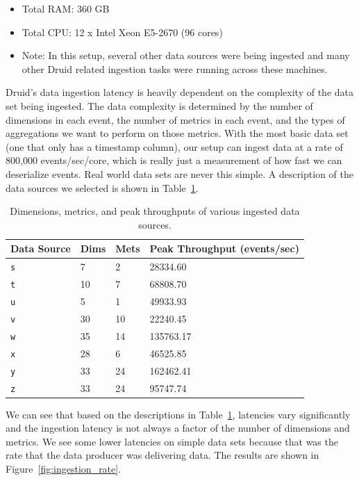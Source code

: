 \documentclass{acm_proc_article-sp}
\begin{document}
\begin{itemize}
\item Total RAM: 360 GB 
\item Total CPU: 12 x Intel Xeon E5-2670 (96 cores)
\item Note: In this setup, several other data sources were being ingested and many other Druid related ingestion tasks were running across these machines.
\end{itemize}

Druid's data ingestion latency is heavily dependent on the complexity of the
data set being ingested. The data complexity is determined by the number of
dimensions in each event, the number of metrics in each event, and the types of
aggregations we want to perform on those metrics. With the most basic data set
(one that only has a timestamp column), our setup can ingest data at a rate of
800,000 events/sec/core, which is really just a measurement of how fast we can
deserialize events. Real world data sets are never this simple. A description
of the data sources we selected is shown in Table~\ref{tab:ingest_datasources}. 

\begin{table}
  \centering
  \caption{Dimensions, metrics, and peak throughputs of various ingested data sources.}
  \label{tab:ingest_datasources}
  \begin{tabular}{| l | l | l | l |}
    \hline
    \textbf{Data Source} & \textbf{Dims} & \textbf{Mets} & \textbf{Peak Throughput (events/sec)} \\ \hline
    \texttt{s} & 7 & 2 & 28334.60 \\ \hline
    \texttt{t} & 10 & 7 & 68808.70 \\ \hline
    \texttt{u} & 5 & 1 & 49933.93 \\ \hline
    \texttt{v} & 30 & 10 & 22240.45 \\ \hline
    \texttt{w} & 35 & 14 & 135763.17 \\ \hline
    \texttt{x} & 28 & 6 & 46525.85 \\ \hline
    \texttt{y} & 33 & 24 & 162462.41 \\ \hline
    \texttt{z} & 33 & 24 & 95747.74 \\ \hline
  \end{tabular}
\end{table}

We can see that based on the descriptions in
Table~\ref{tab:ingest_datasources}, latencies vary significantly and the
ingestion latency is not always a factor of the number of dimensions and
metrics. We see some lower latencies on simple data sets because that was the rate that the
data producer was delivering data. The results are shown in Figure~\ref{fig:ingestion_rate}.
\end{document}
